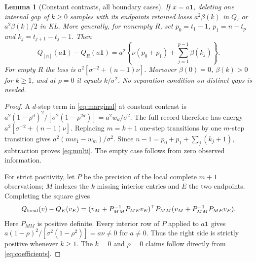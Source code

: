 \documentclass[11pt]{article}
\newtheorem{lemma}{Lemma}
\newcommand{\one}{\mathbf 1}
\newcommand{\sig}{\sigma}
\begin{document}
\begin{lemma}[Constant contrasts, all boundary cases]\label{lem:constant}
If $x=a\one$, deleting one internal gap of $k\ge0$ samples with its endpoints
retained loses $a^2\beta(k)$ in $Q$, or $a^2\beta(k)/2$ in KL. More generally,
for nonempty $R$, set $p_0=t_1-1$, $p_1=n-t_p$ and
$k_j=t_{j+1}-t_j-1$. Then
\begin{equation}\label{eq:multi}
 Q_{[n]}(a\one)-Q_R(a\one)
 =a^2\left\{\nu(p_0+p_1)+\sum_{j=1}^{p-1}\beta(k_j)\right\}.
\end{equation}
For empty $R$ the loss is $a^2[\sig^{-2}+(n-1)\nu]$.
Moreover $\beta(0)=0$, $\beta(k)>0$ for $k\ge1$, and at $\rho=0$ it equals
$k/\sig^2$. No separation condition on distinct gaps is needed.
\end{lemma}
\begin{proof}
A $d$-step term in \eqref{eq:marginal} at constant contrast is
$a^2(1-\rho^d)^2/[\sig^2(1-\rho^{2d})]=a^2w_d/\sig^2$.
The full record therefore has energy $a^2[\sig^{-2}+(n-1)\nu]$.
Replacing $m=k+1$ one-step transitions by one $m$-step transition gives
$a^2(mw_1-w_m)/\sig^2$. Since
$n-1=p_0+p_1+\sum_j(k_j+1)$, subtraction proves \eqref{eq:multi}.
The empty case follows from zero observed information.

For strict positivity, let $P$ be the precision of the local complete
$m+1$ observations; $M$ indexes the $k$ missing interior entries and $E$ the
two endpoints. Completing the square gives
\begin{equation}\label{eq:schur}
 Q_{\rm local}(v)-Q_E(v_E)
 =(v_M+P_{MM}^{-1}P_{ME}v_E)^\top P_{MM}
 (v_M+P_{MM}^{-1}P_{ME}v_E).
\end{equation}
Here $P_{MM}$ is positive definite. Every interior row of $P$ applied to
$a\one$ gives
$a(1-\rho)^2/[\sig^2(1-\rho^2)]=a\nu\ne0$ for $a\ne0$.
Thus the right side is strictly positive whenever $k\ge1$.
The $k=0$ and $\rho=0$ claims follow directly from \eqref{eq:coefficients}.
\end{proof}
\end{document}

